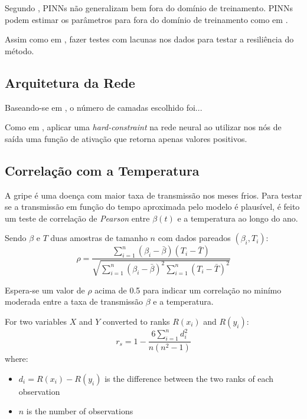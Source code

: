 Segundo \cite{bonfanti-etal:24-generalizacao-pinns}, PINNs não generalizam bem
fora do domínio de treinamento. PINNs podem estimar os parâmetros para fora
do domínio de treinamento como em \cite{millevoi-etal:24-split-join-pinns}.

Assim como em \cite{ghosh-etal:23-subnotificacao}, fazer testes com lacunas
nos dados para testar a resiliência do método.

\subsection{Arquitetura da Rede}

Baseando-se em \cite{shaier-etal:22-dinns}, o número de camadas escolhido foi...

Como em \cite{millevoi-etal:24-split-join-pinns}, aplicar uma 
\textit{hard-constraint} na rede neural ao utilizar nos nós de saída
uma função de ativação que retorna apenas valores positivos.

\subsection{Correlação com a Temperatura}

A gripe é uma doença com maior taxa de transmissão nos meses frios. 
Para testar se a transmissão em função do tempo aproximada pelo modelo é plausível,
é feito um teste de correlação de \textit{Pearson} entre $\beta(t)$ e a temperatura
ao longo do ano.

Sendo $\beta$ e $T$ duas amostras de tamanho $n$ com dados pareados $(\beta_i, T_i)$:
\begin{equation}\label{correlacao-de-pearson}
\rho = \frac{\sum_{i=1}^{n} (\beta_i - \bar{\beta})(T_i - \bar{T})}{\sqrt{\sum_{i=1}^{n} (\beta_i - \bar{\beta})^2 \sum_{i=1}^{n} (T_i - \bar{T})^2}}
\end{equation}

Espera-se um valor de $\rho$ acima de 0.5 para indicar um correlação no minímo moderada
entre a taxa de transmissão $\beta$ e a temperatura.

For two variables $X$ and $Y$ converted to ranks $R(x_i)$ and $R(y_i)$:
\begin{equation}
r_s = 1 - \frac{6 \sum_{i=1}^{n} d_i^2}{n(n^2 - 1)}
\end{equation}
where:
\begin{itemize}
    \item $d_i = R(x_i) - R(y_i)$ is the difference between the two ranks of each observation
    \item $n$ is the number of observations
\end{itemize}

